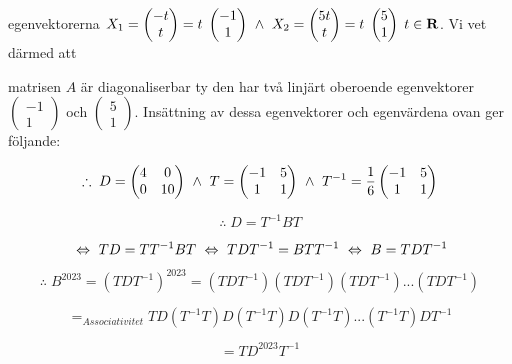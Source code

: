\documentclass{article}
\begin{document}
\vskip 0.1cm

egenvektorerna $X_{1}=\begin{pmatrix} -t \\ t \end{pmatrix}=t \; \begin{pmatrix} -1 \\ 1 \end{pmatrix} \ \wedge \  X_{2}=\begin{pmatrix} 5t \\ t \end{pmatrix}=t \; \begin{pmatrix} 5 \\ 1 \end{pmatrix} \; t \in \mathbf{R}$. Vi vet därmed att 

\vskip 0.1cm

matrisen $A$ är diagonaliserbar ty den har två linjärt oberoende egenvektorer $\begin{pmatrix} -1 \\ 1 \end{pmatrix}$ och $\begin{pmatrix} 5 \\ 1 \end{pmatrix}$. Insättning av dessa egenvektorer och egenvärdena ovan ger följande:

\vskip 0.3cm

$$
\therefore 
\; 
D=
\begin{pmatrix}
    4 & 0 \\
    0 & 10 
\end{pmatrix}
\ \wedge \ 
T=
\begin{pmatrix}
    -1 & 5 \\
    1 & 1 
\end{pmatrix}
\ \wedge \ 
T^{-1}=
\frac{1}{6}
\begin{pmatrix}
    -1 & 5 \\
    1 & 1 
\end{pmatrix}
$$

\vskip 0.3cm

$$
\therefore
\;
D=T^{-1}BT
$$

\vskip -0.2cm

$$
\ \Leftrightarrow \ 
TD=TT^{-1}BT
\ \Leftrightarrow \ 
TDT^{-1}=BTT^{-1}
\ \Leftrightarrow \ 
B=TDT^{-1}
$$

$$
\therefore
\;
B^{2023}=(TDT^{-1})^{2023}=(TDT^{-1})(TDT^{-1})(TDT^{-1})...(TDT^{-1})
$$

$$
=_{Associativitet}
TD(T^{-1}T)D(T^{-1}T)D(T^{-1}T)...(T^{-1}T)DT^{-1}
$$

$$
=
TD^{2023}T^{-1}
$$
\end{document}
